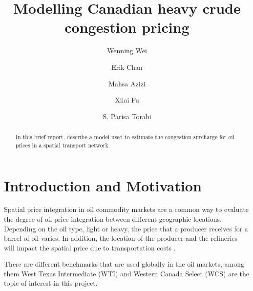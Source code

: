 \documentclass[11pt]{m2pi}
\begin{document}
\title{Modelling Canadian heavy crude congestion pricing}

\author{Wenning Wei}
\address{University of Calgary, Dept. of Math. and Stat.
2500 University Drive NW, Calgary AB, T2N 1N4, Canada}

\author{Erik Chan}
\address{University of Calgary, Dept. of Math. and Stat.
2500 University Drive NW, Calgary AB, T2N 1N4, Canada}


\author{Mahsa Azizi}
\address{}
\email{}
\author{Xilai Fu}
\address{}
\email{}
\author{S. Parisa Torabi}
\address{}

\begin{abstract}
In this brief report, describe a model used to estimate the congestion surcharge for oil prices in a spatial transport network.
\end{abstract}


\maketitle

\section{Introduction and Motivation}
Spatial price integration in oil commodity markets are a common way to evaluate the degree of oil price integration between different geographic locations. Depending on the oil type, light or heavy, the price that a producer receives for a barrel of oil varies. In addition, the location of the producer and the refineries will impact the spatial price due to transportation costs \cite{Zhu2020}.


There are different benchmarks that are used globally in the oil markets, among them West Texas Intermediate (WTI) and Western Canada Select (WCS) are the topic of interest in this project.
\end{document}
